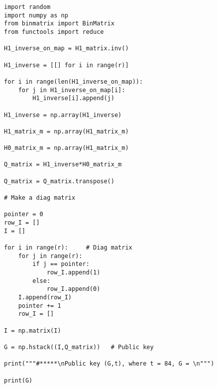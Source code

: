 \documentclass[12pt]{article}
\begin{document}
\begin{verbatim}
import random
import numpy as np
from binmatrix import BinMatrix
from functools import reduce

H1_inverse_on_map = H1_matrix.inv()

H1_inverse = [[] for i in range(r)]

for i in range(len(H1_inverse_on_map)):
    for j in H1_inverse_on_map[i]:
        H1_inverse[i].append(j)

H1_inverse = np.array(H1_inverse)

H1_matrix_m = np.array(H1_matrix_m)

H0_matrix_m = np.array(H1_matrix_m)

Q_matrix = H1_inverse*H0_matrix_m

Q_matrix = Q_matrix.transpose()

# Make a diag matrix

pointer = 0
row_I = []
I = []

for i in range(r):     # Diag matrix
    for j in range(r):
        if j == pointer:
            row_I.append(1)
        else:
            row_I.append(0)
    I.append(row_I)
    pointer += 1
    row_I = []

I = np.matrix(I)

G = np.hstack((I,Q_matrix))   # Public key

print("""#*****\nPublic key (G,t), where t = 84, G = \n""")

print(G)
\end{verbatim}
\end{document}
